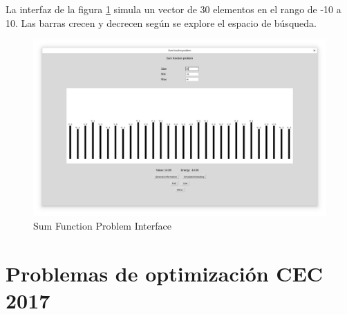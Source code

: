 \documentclass[12pt,twoside]{article}
\begin{document}
	La interfaz de la figura \ref{fig:sfp} simula un vector de 30 elementos en el rango de -10 a 10. Las barras crecen y decrecen según se explore el espacio de búsqueda. 
	
	\begin{figure}[h!]
		\centering
		\includegraphics[width=\linewidth]{img/sfp}
		\caption{Sum Function Problem Interface}
		\label{fig:sfp}
	\end{figure}
	
	\clearpage
	\section{Problemas de optimización CEC 2017}
	
\end{document}
